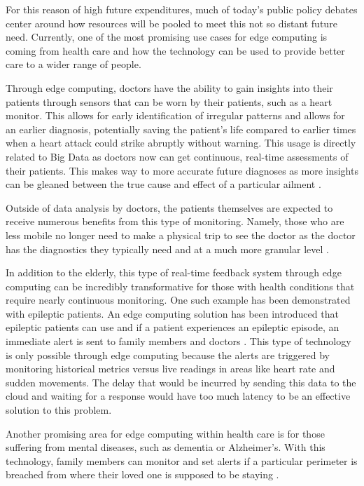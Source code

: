 \documentclass[sigconf]{acmart}
\begin{document}
For this reason of high future expenditures, much of today's public policy debates center around how resources will be pooled to meet this not so distant future need. Currently, one of the most promising use cases for edge computing is coming from health care and how the technology can be used to provide better care to a wider range of people. 

Through edge computing, doctors have the ability to gain insights into their patients through sensors that can be worn by their patients, such as a heart monitor. This allows for early identification of irregular patterns and allows for an earlier diagnosis, potentially saving the patient's life compared to earlier times when a heart attack could strike abruptly without warning. This usage is directly related to Big Data as doctors now can get continuous, real-time assessments of their patients. This makes way to more accurate future diagnoses as more insights can be gleaned between the true cause and effect of a particular ailment \cite{heart}.

Outside of data analysis by doctors, the patients themselves are expected to receive numerous benefits from this type of monitoring. Namely, those who are less mobile no longer need to make a physical trip to see the doctor as the doctor has the diagnostics they typically need and at a much more granular level \cite{elderly}. 

In addition to the elderly, this type of real-time feedback system through edge computing can be incredibly transformative for those with health conditions that require nearly continuous monitoring. One such example has been demonstrated with epileptic patients. An edge computing solution has been introduced that epileptic patients can use and if a patient experiences an epileptic episode, an immediate alert is sent to family members and doctors \cite{edgehealth}. This type of technology is only possible through edge computing because the alerts are triggered by monitoring historical metrics versus live readings in areas like heart rate and sudden movements. The delay that would be incurred by sending this data to the cloud and waiting for a response would have too much latency to be an effective solution to this problem.

Another promising area for edge computing within health care is for those suffering from mental diseases, such as dementia or Alzheimer's. With this technology, family members can monitor and set alerts if a particular perimeter is breached from where their loved one is supposed to be staying \cite{seniorgps}. 
\end{document}
